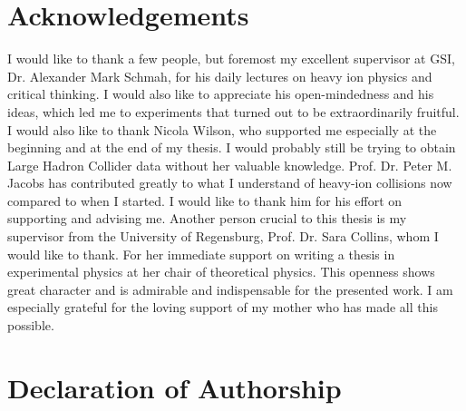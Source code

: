 \documentclass[
  a4paper,
  12pt,
  oneside,
  parskip=half,
  listof=totoc,
  bibliography=totoc,
  DIV=12,
  numbers=noenddot
  ]{scrartcl}
\begin{document}
\pagebreak



\pagebreak




%

\pagebreak



\pagebreak



\pagebreak

\printbibliography{}

\pagebreak


\pagebreak

\section*{Acknowledgements}


I would like to thank a few people, but foremost my excellent supervisor at GSI, Dr. Alexander Mark Schmah, for his daily lectures on heavy ion physics and critical thinking. I would also like to appreciate his open-mindedness and his ideas, which led me to experiments that turned out to be extraordinarily fruitful. I would also like to thank Nicola Wilson, who supported me especially at the beginning and at the end of my thesis. I would probably still be trying to obtain Large Hadron Collider data without her valuable knowledge. Prof. Dr. Peter M. Jacobs has contributed greatly to what I understand of heavy-ion collisions now compared to when I started. I would like to thank him for his effort on supporting and advising me. Another person crucial to this thesis is my supervisor from the University of Regensburg, Prof. Dr. Sara Collins, whom I would like to thank. For her immediate support on writing a thesis in experimental physics at her chair of theoretical physics. This openness shows great character and is admirable and indispensable for the presented work. I am especially grateful for the loving support of my mother who has made all this possible.


\pagebreak

\section*{Declaration of Authorship}
\end{document}
